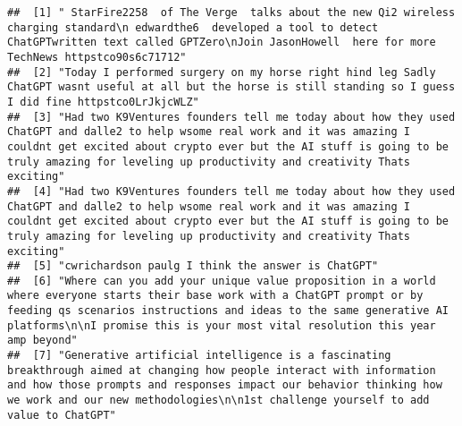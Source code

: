 \documentclass[
]{article}
\newenvironment{Shaded}{\begin{snugshade}}{\end{snugshade}}
\newcommand{\FunctionTok}[1]{\textcolor[rgb]{0.00,0.00,0.00}{#1}}
\newcommand{\NormalTok}[1]{#1}
\newcommand{\SpecialCharTok}[1]{\textcolor[rgb]{0.00,0.00,0.00}{#1}}
\newcommand{\StringTok}[1]{\textcolor[rgb]{0.31,0.60,0.02}{#1}}
\begin{document}
\begin{Shaded}
\end{Shaded}

\begin{verbatim}
##  [1] " StarFire2258  of The Verge  talks about the new Qi2 wireless charging standard\n edwardthe6  developed a tool to detect ChatGPTwritten text called GPTZero\nJoin JasonHowell  here for more TechNews httpstco90s6c71712"                                                                                          
##  [2] "Today I performed surgery on my horse right hind leg Sadly ChatGPT wasnt useful at all but the horse is still standing so I guess I did fine httpstco0LrJkjcWLZ"                                                                                                                                                   
##  [3] "Had two K9Ventures founders tell me today about how they used ChatGPT and dalle2 to help wsome real work and it was amazing I couldnt get excited about crypto ever but the AI stuff is going to be truly amazing for leveling up productivity and creativity Thats exciting"                                      
##  [4] "Had two K9Ventures founders tell me today about how they used ChatGPT and dalle2 to help wsome real work and it was amazing I couldnt get excited about crypto ever but the AI stuff is going to be truly amazing for leveling up productivity and creativity Thats exciting"                                      
##  [5] "cwrichardson paulg I think the answer is ChatGPT"                                                                                                                                                                                                                                                                  
##  [6] "Where can you add your unique value proposition in a world where everyone starts their base work with a ChatGPT prompt or by feeding qs scenarios instructions and ideas to the same generative AI platforms\n\nI promise this is your most vital resolution this year amp beyond"                                 
##  [7] "Generative artificial intelligence is a fascinating breakthrough aimed at changing how people interact with information and how those prompts and responses impact our behavior thinking how we work and our new methodologies\n\n1st challenge yourself to add value to ChatGPT"                                  

\end{verbatim}
\end{document}
